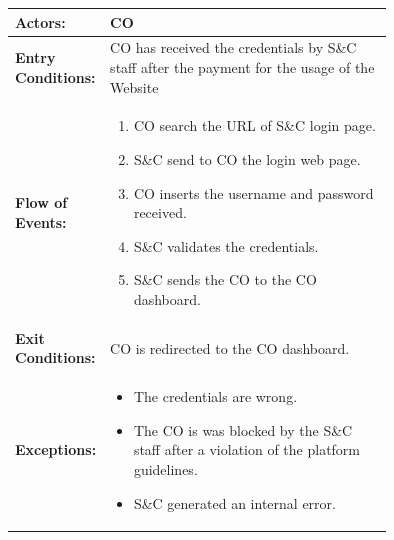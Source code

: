 \begin{center}
    \begin{longtable}{|l|p{0.75\linewidth}|}
        \hline
        \textbf{Actors:}           & CO                                                                                                                   \\
        \hline
        \textbf{Entry Conditions:} & CO has received the credentials by S\&C staff after the payment for the usage of the Website                          \\
        \hline
        \textbf{Flow of Events:}   & \begin{enumerate}
                \item CO search the URL of S\&C login page.
                \item S\&C send to CO the login web page.
                \item CO inserts the username and password received.
                \item S\&C validates the credentials.
                \item S\&C sends the CO to the CO dashboard.
                                     \end{enumerate} \\
        \hline
        \textbf{Exit Conditions:}  & CO is redirected to the CO dashboard.                                               \\
        \hline
        \textbf{Exceptions:}       & 
            \begin{itemize}
                \item The credentials are wrong.
                \item The CO is was blocked by the S\&C staff after a violation of the platform guidelines.
                \item S\&C generated an internal error.
            \end{itemize}                                                                                   \\
        \hline
    \end{longtable}
\end{center}

